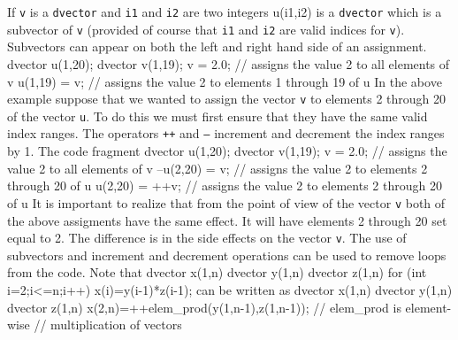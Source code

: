 \documentclass[12pt]{book}
\begin{document}
If {\tt v} is a {\tt dvector} and {\tt i1} and {\tt i2} are two integers  
\beginexample
 u(i1,i2)
\endexample
\noindent is a {\tt dvector} which is a subvector of {\tt v} (provided of
course that {\tt i1} and {\tt i2} are valid indices for {\tt v}). Subvectors
can appear on both the left and right hand side of an assignment.
\beginexample
dvector  u(1,20);
dvector v(1,19);
v = 2.0;   // assigns the value 2 to all elements of v
u(1,19) = v; // assigns the value 2 to elements 1 through 19 of u
\endexample
{}
In the above example suppose that we wanted to assign the vector {\tt v}
to elements 2 through 20 of the vector {\tt u}. To do this we must first ensure that
they have the same valid index ranges. The operators {\tt ++} and {\tt --}
increment and decrement the index ranges by 1. The code fragment
\beginexample
dvector  u(1,20);
dvector v(1,19);
v = 2.0;   // assigns the value 2 to all elements of v
--u(2,20) = v; // assigns the value 2 to elements 2 through 20 of u
u(2,20) = ++v; // assigns the value 2 to elements 2 through 20 of u
\endexample
\noindent It is important to realize that from the point of view of the vector
{\tt v} both of the above assigments have the same effect. It will have
elements 2 through 20 set equal to 2. The difference is in the side
effects on the vector {\tt v}. The use of subvectors and increment and decrement
operations can be used to remove loops from the code. Note that
\beginexample
dvector x(1,n)
dvector y(1,n)
dvector z(1,n)
for (int i=2;i<=n;i++)
{
  x(i)=y(i-1)*z(i-1);
}
\endexample
\noindent can be written as
\beginexample
dvector x(1,n)
dvector y(1,n)
dvector z(1,n)
x(2,n)=++elem_prod(y(1,n-1),z(1,n-1));  // elem_prod is element-wise 
                                       // multiplication of vectors
\endexample
 
\end{document}
